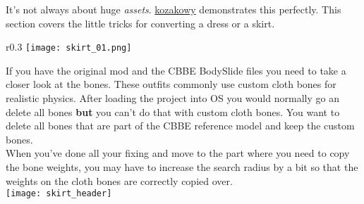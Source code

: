 It's not always about huge \textit{assets}. \href{https://www.nexusmods.com/users/11770218?tab=user+files}{kozakowy} demonstrates this
perfectly. This section covers the little tricks for converting a dress or a skirt.
\begin{wrapfigure}[10]{r}{0.3\textwidth}
    \vspace{-12pt}
    \texttt{[image: skirt\_01.png]}
\end{wrapfigure}
If you have the original mod and the CBBE BodySlide files you need to take a closer look at the bones. These outfits commonly use 
custom cloth bones for realistic physics. After loading the project into OS you would normally go an delete all bones \textbf{but} 
you can't do that with custom cloth bones. You want to delete all bones that are part of the CBBE reference model and keep the 
custom bones.\\
When you've done all your fixing and move to the part where you need to copy the bone weights, you may have to increase the search 
radius by a bit so that the weights on the cloth bones are correctly copied over.\\
\linebreak
\linebreak
\linebreak
\linebreak
\linebreak
\linebreak
\linebreak
\linebreak
\linebreak
\linebreak
\linebreak
\linebreak
\linebreak
\linebreak
\linebreak
\linebreak
\texttt{[image: skirt\_header]}
